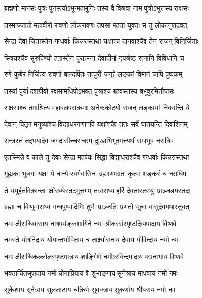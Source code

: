 \twolineshloka
{ब्रह्मणो मानसः पुत्रः पुनस्त्योऽभून्महामुनिः}
{तस्य वै विश्रवा नाम पुत्रोऽभूत्तस्य राक्षसः} %

\twolineshloka
{तस्माज्जातो महावीरो रावणो लोकरावणः}
{तपसा महता युक्तः स तु लोकानुपाद्रवत्} %

\twolineshloka
{सेन्द्रा देवा जितास्तेन गन्धर्वाः किन्नरास्तथा}
{यक्षाश्च दानवाश्चैव तेन राजन् विनिर्जिताः} %

\twolineshloka
{स्त्रियश्चैव सुरुपिण्यो हतास्तेन दुरात्मना}
{देवादीनां नृपश्रेष्ठ रत्नानि विविधानि च} %

\twolineshloka
{रणे कुबेरं निर्जित्य रावणो बलदर्पितः}
{तत्पुरीं जगृहे लङ्कां विमानं चापि पुष्पकम्} %

\twolineshloka
{तस्यां पुर्यां दशग्रीवो रक्षसामधिपोऽभवत्}
{पुत्राश्च बहवस्तस्य बभूवुरमितौजसः} %

\twolineshloka
{राक्षसाश्च तमाश्रित्य महाबलपराक्रमाः}
{अनेककोटयो राजन् लङ्कायां निवसन्ति ये} %

\twolineshloka
{देवान् पितृन मनुष्यांश्च विद्याधरगणानपि}
{यक्षांश्चैव ततः सर्वे घातयन्ति दिवाशिनम्} %

\twolineshloka
{सन्त्रस्तं तद्भयादेव जगदासीच्चराचरम्}
{दुःखाभिभूतमत्त्यर्थं सम्बभूव नराधिप} %

\twolineshloka
{एतस्मिन्ने व काले तु देवाः सेन्द्रा महर्षयः}
{सिद्धा विद्याधराश्चैव गन्धर्वाः किन्नरास्तथा} %

\twolineshloka
{गुह्यका भुजगा यक्षा ये चान्ये स्वर्गवासिनः}
{ब्रह्माणमग्रतः कृत्वा शङ्करं च नराधिप} %

\twolineshloka
{ते ययुर्हतविक्रान्ताः क्षीराब्धेस्तटमुत्तमम्}
{तत्राराध्य हरिं देवतास्तस्थुः प्राञ्जलयस्तदा} %

\twolineshloka
{ब्रह्मा च विष्णुमाराध्य गन्धपुष्पादिभिः शुभैः}
{प्राञ्जलिः प्रणतो भूत्वा वासुदेवमथास्तुवत्} %


\twolineshloka
{नमः क्षीराब्धिवासाय नागपर्यङ्कशायिने}
{नमः श्रीकरसंस्पृष्टदिव्यपादाय विष्णवे} %

\twolineshloka
{नमस्ते योगनिद्राय योगान्तर्भाविताय च}
{तार्क्ष्यासनाय देवाय गोविन्दाय नमो नमः} %

\twolineshloka
{नमः क्षीराब्धिकल्लोलस्पृष्टमात्राय शार्ङ्गिणे}
{नमोऽरविन्दपादाय पद्मनाभाय विष्णवे} %

\twolineshloka
{भक्तार्चितसुपादाय नमो योगाप्रियाय वै}
{शुभाङ्गाय सुनेत्राय माधवाय नमो नमः} %

\twolineshloka
{सुकेशाय सुनेत्राय सुललाटाय चक्रिणे}
{सुवक्त्राय सुकर्णाय श्रीधराय नमो नमः} %


